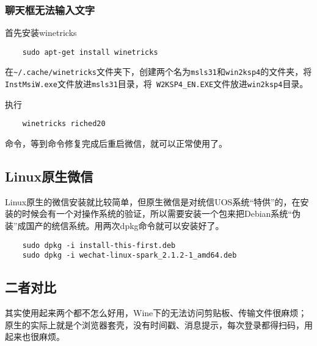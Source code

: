 \subsubsection{聊天框无法输入文字}
首先安装winetricks
\begin{lstlisting}
	sudo apt-get install winetricks
\end{lstlisting}
在\lstinline|~/.cache/winetricks|文件夹下，创建两个名为\lstinline|msls31|和\lstinline|win2ksp4|的文件夹，将\lstinline| InstMsiW.exe|文件放进\lstinline|msls31|目录，将\lstinline| W2KSP4_EN.EXE|文件放进\lstinline|win2ksp4|目录。

执行
\begin{lstlisting}
	winetricks riched20
\end{lstlisting}
命令，等到命令修复完成后重启微信，就可以正常使用了。


\subsection{Linux原生微信}
Linux原生的微信安装就比较简单，但原生微信是对统信UOS系统“特供”的，在安装的时候会有一个对操作系统的验证，所以需要安装一个包来把Debian系统“伪装”成国产的统信系统。用两次dpkg命令就可以安装好了。
\begin{lstlisting}
	sudo dpkg -i install-this-first.deb
	sudo dpkg -i wechat-linux-spark_2.1.2-1_amd64.deb
\end{lstlisting}
\subsection{二者对比}
其实使用起来两个都不怎么好用，Wine下的无法访问剪贴板、传输文件很麻烦；原生的实际上就是个浏览器套壳，没有时间戳、消息提示，每次登录都得扫码，用起来也很麻烦。

